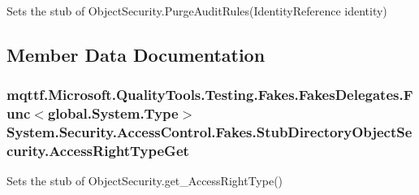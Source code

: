 Sets the stub of Object\-Security.\-Purge\-Audit\-Rules(\-Identity\-Reference identity)



\subsection{Member Data Documentation}
\hypertarget{class_system_1_1_security_1_1_access_control_1_1_fakes_1_1_stub_directory_object_security_ae98c4b5e7d849d550ae172807f437976}{
\subsubsection[{Access\-Right\-Type\-Get}]{\setlength{\rightskip}{0pt plus 5cm}mqttf.\-Microsoft.\-Quality\-Tools.\-Testing.\-Fakes.\-Fakes\-Delegates.\-Func$<$global.\-System.\-Type$>$ System.\-Security.\-Access\-Control.\-Fakes.\-Stub\-Directory\-Object\-Security.\-Access\-Right\-Type\-Get}}\label{class_system_1_1_security_1_1_access_control_1_1_fakes_1_1_stub_directory_object_security_ae98c4b5e7d849d550ae172807f437976}


Sets the stub of Object\-Security.\-get\-\_\-\-Access\-Right\-Type()

